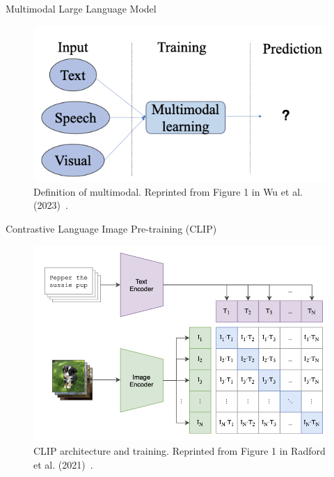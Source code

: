 \documentclass[12pt]{beamer}
\begin{document}
\begin{frame}[allowframebreaks]{Multimodal Large Language Model}
    \begin{figure}
        \centering
        \includegraphics[width=0.9\linewidth]{figures/multimodal_definition.png}
        \caption{Definition of multimodal. Reprinted from Figure 1 in Wu et al. (2023)~\cite{10386743}.}
        \label{fig:Fig. 7}
    \end{figure}
\end{frame}

\begin{frame}[allowframebreaks]{Contrastive Language Image Pre-training (CLIP)}
    \begin{figure}
        \centering
        \includegraphics[height=0.56\textheight]{figures/clip.png}
        \caption{CLIP architecture and training. Reprinted from Figure 1 in Radford et al. (2021)~\cite{pmlr-v139-radford21a}.}
        \label{fig:Fig. 8}
    \end{figure}
\end{frame}
\end{document}
